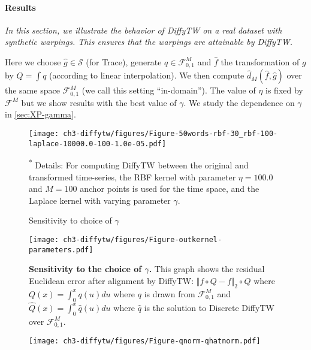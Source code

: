 \paragraph{Results}

\emph{In this section, we illustrate the behavior of DiffyTW on a real dataset with synthetic warpings. This ensures that the warpings are attainable by DiffyTW.}

Here we choose $\hat g\in\mathcal S$ (for Trace), generate $q \in \mathcal F_{0, 1}^M$ and $\hat f$ the transformation of $g$ by $Q = \int q$ (according to linear interpolation). We then compute $\hat d_M(\hat f, \hat g)$ over the same space $\mathcal F_{0,1}^M$ (we call this setting ``in-domain''). The value of $\eta$ is fixed by $\mathcal F^M$ but we show results with the best value of $\gamma$. We study the dependence on $\gamma$ in \cref{sec:XP-gamma}.


\begin{figure}[ht!]
\begin{center}
\texttt{[image: ch3-diffytw/figures/Figure-50words-rbf-30\_rbf-100-laplace-10000.0-100-1.0e-05.pdf]}
\end{center}
\caption[itopto]{Sensitivity to choice of $\gamma$}
\small\textsuperscript{*} Details: For computing DiffyTW between the original and transformed time-series, the RBF kernel with parameter $\eta=100.0$ and $M=100$ anchor points is used for the time space, and the Laplace kernel with varying parameter $\gamma$.
\end{figure}

\begin{figure}[ht!]
\centering
\texttt{[image: ch3-diffytw/figures/Figure-outkernel-parameters.pdf]}
\caption[Sensitivity of DiffyTW to the choice of $\gamma$.]{\textbf{Sensitivity to the choice of $\gamma$.} This graph shows the residual Euclidean error after alignment by DiffyTW: $\Vert f\circ Q - f\Vert_2\circ \hat Q$ where $Q(x) = \int_0^x q(u)du$ where $q$ is drawn from $\mathcal F_{0,1}^M$ and $\hat Q(x) = \int_0^x \hat q(u)du$ where $\hat q$ is the solution to Discrete DiffyTW over $\mathcal F_{0,1}^M$.}
\end{figure}

\begin{figure}[ht!]
\centering
\texttt{[image: ch3-diffytw/figures/Figure-qnorm-qhatnorm.pdf]}
\caption{}
\end{figure}
